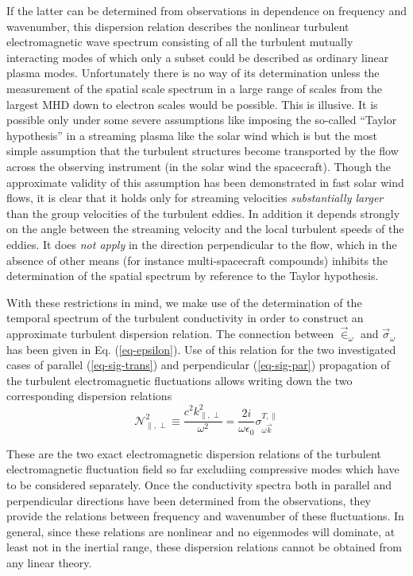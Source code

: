 \documentclass[ ]{copernicus2}
\begin{document}
{{If the latter can be determined from observations in dependence on frequency and wavenumber, this dispersion relation describes the nonlinear turbulent electromagnetic wave spectrum consisting of all the turbulent mutually interacting modes of which only a subset could be described as ordinary linear plasma modes. Unfortunately there is no way of its determination unless the measurement of the spatial scale spectrum in a large range of scales from the largest MHD down to electron scales would be possible. This is illusive. It is possible only under some severe assumptions like imposing the so-called ``Taylor hypothesis'' in a streaming plasma like the solar wind which is but the most simple assumption that the turbulent structures become transported by the flow across the observing instrument (in the solar wind the spacecraft). Though the approximate validity of this assumption has been demonstrated in fast solar wind flows, it is clear that it holds only for streaming velocities \emph{substantially larger} than the group velocities of the turbulent eddies. In addition it depends strongly on the angle between the streaming velocity and the local turbulent speeds of the eddies. It does \emph{not apply} in the direction perpendicular to the flow, which in the absence of other means (for instance multi-spacecraft compounds) inhibits the determination of the spatial spectrum by reference to the Taylor hypothesis.}

With these restrictions in mind, we make use of the determination of the temporal spectrum of the turbulent conductivity in order to construct an approximate turbulent dispersion relation. The connection between $\vec{\in}_\omega$ and $\vec{\sigma}_\omega$ has been given in Eq. (\ref{eq-epsilon}). Use of this relation for the two investigated cases of parallel (\ref{eq-sig-trans}) and perpendicular (\ref{eq-sig-par}) propagation of the turbulent electromagnetic fluctuations allows writing down the two corresponding dispersion relations
\begin{equation}\label{eq-disprel}
\mathcal{N}^2_{\|,\perp}\equiv\frac{c^2k_{\|,\perp}^2}{\omega^2}= \frac{2i}{\omega\epsilon_0}\sigma_{\omega\vec{k}}^{T,\|}
\end{equation}

These are the two exact electromagnetic dispersion relations of the turbulent electromagnetic fluctuation field so far excludiing compressive modes which have to be considered separately. Once the conductivity spectra both in parallel and perpendicular directions have been determined from the observations, they  provide the relations between frequency and wavenumber of these fluctuations. In general, since these relations are nonlinear and no eigenmodes will dominate, at least not in the inertial range, these dispersion relations cannot be obtained from any linear theory.
  
}
\end{document}
